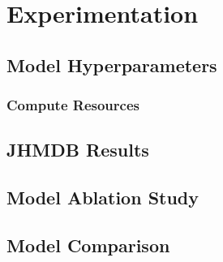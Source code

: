 
\chapter{Experimentation} %

\label{Experimentation} %

\section{Model Hyperparameters}

\subsection{Compute Resources}

\section{JHMDB Results}

\section{Model Ablation Study}

\section{Model Comparison}